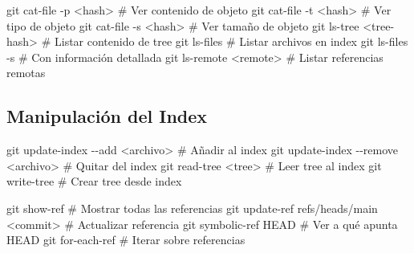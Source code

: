 \documentclass[
  doc,
  floatsintext,
  longtable,
  a4paper,
  nolmodern,
  notxfonts,
  notimes,
  12pt,
  colorlinks=true,linkcolor=blue,citecolor=blue,urlcolor=blue]{apa7}
\newenvironment{Shaded}{\begin{snugshade}}{\end{snugshade}}
\newcommand{\AttributeTok}[1]{\textcolor[rgb]{0.40,0.45,0.13}{#1}}
\newcommand{\CommentTok}[1]{\textcolor[rgb]{0.37,0.37,0.37}{#1}}
\newcommand{\FunctionTok}[1]{\textcolor[rgb]{0.28,0.35,0.67}{#1}}
\newcommand{\NormalTok}[1]{\textcolor[rgb]{0.00,0.23,0.31}{#1}}
\newcommand{\OperatorTok}[1]{\textcolor[rgb]{0.37,0.37,0.37}{#1}}
\begin{document}
\begin{Shaded}
\begin{Highlighting}[]
\FunctionTok{git}\NormalTok{ cat{-}file }\AttributeTok{{-}p} \OperatorTok{\textless{}}\NormalTok{hash}\OperatorTok{\textgreater{}}     \CommentTok{\# Ver contenido de objeto}
\FunctionTok{git}\NormalTok{ cat{-}file }\AttributeTok{{-}t} \OperatorTok{\textless{}}\NormalTok{hash}\OperatorTok{\textgreater{}}     \CommentTok{\# Ver tipo de objeto}
\FunctionTok{git}\NormalTok{ cat{-}file }\AttributeTok{{-}s} \OperatorTok{\textless{}}\NormalTok{hash}\OperatorTok{\textgreater{}}     \CommentTok{\# Ver tamaño de objeto}
\FunctionTok{git}\NormalTok{ ls{-}tree }\OperatorTok{\textless{}}\NormalTok{tree{-}hash}\OperatorTok{\textgreater{}}    \CommentTok{\# Listar contenido de tree}
\FunctionTok{git}\NormalTok{ ls{-}files               }\CommentTok{\# Listar archivos en index}
\FunctionTok{git}\NormalTok{ ls{-}files }\AttributeTok{{-}s}            \CommentTok{\# Con información detallada}
\FunctionTok{git}\NormalTok{ ls{-}remote }\OperatorTok{\textless{}}\NormalTok{remote}\OperatorTok{\textgreater{}}     \CommentTok{\# Listar referencias remotas}
\end{Highlighting}
\end{Shaded}

\subsection{Manipulación del Index}\label{manipulaciuxf3n-del-index}

\begin{Shaded}
\begin{Highlighting}[]
\FunctionTok{git}\NormalTok{ update{-}index }\AttributeTok{{-}{-}add} \OperatorTok{\textless{}}\NormalTok{archivo}\OperatorTok{\textgreater{}}     \CommentTok{\# Añadir al index}
\FunctionTok{git}\NormalTok{ update{-}index }\AttributeTok{{-}{-}remove} \OperatorTok{\textless{}}\NormalTok{archivo}\OperatorTok{\textgreater{}}  \CommentTok{\# Quitar del index}
\FunctionTok{git}\NormalTok{ read{-}tree }\OperatorTok{\textless{}}\NormalTok{tree}\OperatorTok{\textgreater{}}       \CommentTok{\# Leer tree al index}
\FunctionTok{git}\NormalTok{ write{-}tree             }\CommentTok{\# Crear tree desde index}
\end{Highlighting}
\end{Shaded}

\begin{Shaded}
\begin{Highlighting}[]
\FunctionTok{git}\NormalTok{ show{-}ref               }\CommentTok{\# Mostrar todas las referencias}
\FunctionTok{git}\NormalTok{ update{-}ref refs/heads/main }\OperatorTok{\textless{}}\NormalTok{commit}\OperatorTok{\textgreater{}}  \CommentTok{\# Actualizar referencia}
\FunctionTok{git}\NormalTok{ symbolic{-}ref HEAD      }\CommentTok{\# Ver a qué apunta HEAD}
\FunctionTok{git}\NormalTok{ for{-}each{-}ref           }\CommentTok{\# Iterar sobre referencias}
\end{Highlighting}
\end{Shaded}
\end{document}
